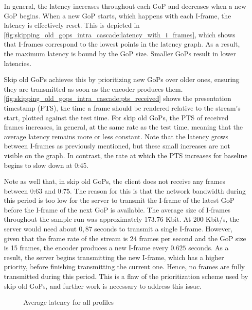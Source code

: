 In general, the latency increases throughout each GoP and decreases when a new GoP begins. When a new GoP starts, which happens with each I-frame, the latency is effectively reset. This is depicted in \autoref{fig:skipping_old_gops_intra_cascade:latency_with_i_frames}, which shows that I-frames correspond to the lowest points in the latency graph. As a result, the maximum latency is bound by the GoP size. Smaller GoPs result in lower latencies.

Skip old GoPs achieves this by prioritizing new GoPs over older ones, ensuring they are transmitted as soon as the encoder produces them. \autoref{fig:skipping_old_gops_intra_cascade:pts_received} shows the presentation timestamp (PTS), the time a frame should be rendered relative to the stream's start, plotted against the test time. For skip old GoPs, the PTS of received frames increases, in general, at the same rate as the test time, meaning that the average latency remains more or less constant. Note that the latency grows between I-frames as previously mentioned, but these small increases are not visible on the graph. %
In contrast, the rate at which the PTS increases for baseline begins to slow down at 0:45.

Note as well that, in skip old GoPs, the client does not receive any frames between 0:63 and 0:75. The reason for this is that the network bandwidth during this period is too low for the server to transmit the I-frame of the latest GoP before the I-frame of the next GoP is available. The average size of I-frames throughout the sample run was approximately 173.76 Kbit. At 200 Kbit/s, the server would need about $0,87$ seconds to transmit a single I-frame. However, given that the frame rate of the stream is 24 frames per second and the GoP size is 15 frames, the encoder produces a new I-frame every $0.625$ seconds. As a result, the server begins transmitting the new I-frame, which has a higher priority, before finishing transmitting the current one. Hence, no frames are fully transmitted during this period. This is a flaw of the prioritization scheme used by skip old GoPs, and further work is necessary to address this issue.

\begin{figure}[H]
    \centering
    
    \caption{Average latency for all profiles}
    \label{fig:avg_latency}
\end{figure}

